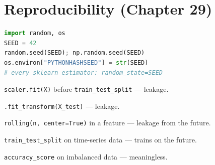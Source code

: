 \section{Reproducibility (Chapter 29)}

\begin{lstlisting}[language=Python]
import random, os
SEED = 42
random.seed(SEED); np.random.seed(SEED)
os.environ["PYTHONHASHSEED"] = str(SEED)
# every sklearn estimator: random_state=SEED
\end{lstlisting}

\begin{alertbox}
\begin{tightnum}
  \item \texttt{scaler.fit(X)} before \texttt{train\_test\_split} --- leakage.
  \item \texttt{.fit\_transform(X\_test)} --- leakage.
  \item \texttt{rolling(n, center=True)} in a feature --- leakage from the future.
  \item \texttt{train\_test\_split} on time-series data --- trains on the future.
  \item \texttt{accuracy\_score} on imbalanced data --- meaningless.
\end{tightnum}
\end{alertbox}

